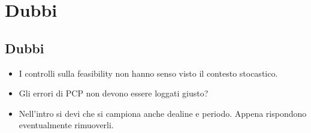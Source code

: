 \chapter{Dubbi}

\section{Dubbi}
\begin{itemize}
    \item I controlli sulla feasibility non hanno senso visto il contesto stocastico.
    \item Gli errori di PCP non devono essere loggati giusto?
    \item Nell'intro si devi che si campiona anche dealine e periodo. Appena rispondono eventualmente rimuoverli.
\end{itemize}
